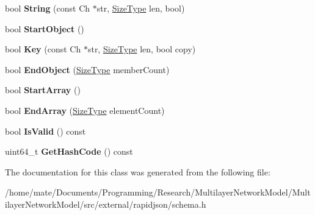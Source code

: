 \begin{DoxyCompactItemize}
\item 
bool {\bfseries String} (const Ch $\ast$str, \hyperlink{rapidjson_8h_a5ed6e6e67250fadbd041127e6386dcb5}{Size\+Type} len, bool)\hypertarget{classinternal_1_1Hasher_a885f2bf42f2bb64d6f9443129dce3883}{}\label{classinternal_1_1Hasher_a885f2bf42f2bb64d6f9443129dce3883}

\item 
bool {\bfseries Start\+Object} ()\hypertarget{classinternal_1_1Hasher_a1607d6cac3daab9725e442e38d121028}{}\label{classinternal_1_1Hasher_a1607d6cac3daab9725e442e38d121028}

\item 
bool {\bfseries Key} (const Ch $\ast$str, \hyperlink{rapidjson_8h_a5ed6e6e67250fadbd041127e6386dcb5}{Size\+Type} len, bool copy)\hypertarget{classinternal_1_1Hasher_a1b34d88f85f9c6a739c1f9038f14f078}{}\label{classinternal_1_1Hasher_a1b34d88f85f9c6a739c1f9038f14f078}

\item 
bool {\bfseries End\+Object} (\hyperlink{rapidjson_8h_a5ed6e6e67250fadbd041127e6386dcb5}{Size\+Type} member\+Count)\hypertarget{classinternal_1_1Hasher_a7050f1552d88967944195163a6a0b08e}{}\label{classinternal_1_1Hasher_a7050f1552d88967944195163a6a0b08e}

\item 
bool {\bfseries Start\+Array} ()\hypertarget{classinternal_1_1Hasher_a2ceb3cc00216f6b6ce66907856a16404}{}\label{classinternal_1_1Hasher_a2ceb3cc00216f6b6ce66907856a16404}

\item 
bool {\bfseries End\+Array} (\hyperlink{rapidjson_8h_a5ed6e6e67250fadbd041127e6386dcb5}{Size\+Type} element\+Count)\hypertarget{classinternal_1_1Hasher_ad445b2730be23e18b4dec2c4d1033419}{}\label{classinternal_1_1Hasher_ad445b2730be23e18b4dec2c4d1033419}

\item 
bool {\bfseries Is\+Valid} () const \hypertarget{classinternal_1_1Hasher_abd4cb8325b81217dc34eecf63d47579f}{}\label{classinternal_1_1Hasher_abd4cb8325b81217dc34eecf63d47579f}

\item 
uint64\+\_\+t {\bfseries Get\+Hash\+Code} () const \hypertarget{classinternal_1_1Hasher_ad44fcaf9a12fefb387e9624327572b61}{}\label{classinternal_1_1Hasher_ad44fcaf9a12fefb387e9624327572b61}

\end{DoxyCompactItemize}


The documentation for this class was generated from the following file\+:\begin{DoxyCompactItemize}
\item 
/home/mate/\+Documents/\+Programming/\+Research/\+Multilayer\+Network\+Model/\+Multilayer\+Network\+Model/src/external/rapidjson/schema.\+h\end{DoxyCompactItemize}
